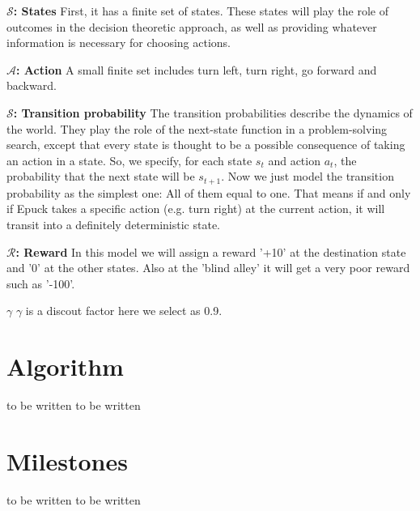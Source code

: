 \documentclass[a4paper, 11pt]{article} %
\begin{document}
\textbf{$\mathcal{S}$: States} First, it has a finite set of states. These states will play the role of outcomes in the decision theoretic approach, as well as providing whatever information is necessary for choosing actions. 

\textbf{$\mathcal{A}$: Action}
A small finite set includes turn left, turn right, go forward and backward.

\textbf{$\mathcal{S}$: Transition probability}
The transition probabilities describe the dynamics of the world. They play the role of the next-state function in a problem-solving search, except that every state is thought to be a possible consequence of taking an action in a state. So, we specify, for each state $s_{t}$ and action $a_{t}$, the probability that the next state will be $s_{t+1}$. 
Now we just model the transition probability as the simplest one: All of them equal to one. That means if and only if Epuck takes a specific action (e.g. turn right) at the current action, it will transit into a definitely deterministic state.

\textbf{$\mathcal{R}$: Reward} In this model we will assign a reward '+10' at the destination state and '0' at the other states. 
Also at the 'blind alley' it will get a very poor reward such as '-100'.

\textbf{$\gamma$}  $\gamma$ is a discout factor here we select as 0.9.


\section{Algorithm}
to be written
to be written


\section{Milestones}
to be written
to be written









\end{document}
